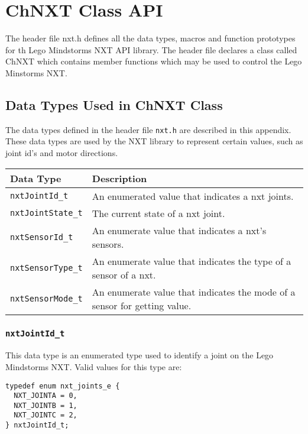 \section{\label{sec:chnxt_api}ChNXT Class API}
The header file nxt.h defines all the data types, macros and function prototypes 
for th Lego Mindstorms NXT API library. The header file declares a class called 
ChNXT which contains member functions which may be used to control the Lego
Minstorms NXT.\\
\subsection{\label{sec:datatypes}Data Types Used in ChNXT Class}
The data types defined in the header file {\tt nxt.h} are described in this 
appendix. These data types are used by the NXT library to represent certain values, 
such as joint id's and motor directions.\\

\noindent
\begin{longtable}{p{3.5cm}p{12cm}} 
    \hline
    Data Type& Description \\
    \hline 
    {\tt nxtJointId\_t} & An enumerated value that indicates a 
    nxt joints. \\
    {\tt nxtJointState\_t} & The current state of a nxt joint. \\
    {\tt nxtSensorId\_t} & An enumerate value that indicates a 
    nxt's sensors. \\
    {\tt nxtSensorType\_t} & An enumerate value that indicates 
    the type of a sensor of a nxt.\\
    {\tt nxtSensorMode\_t} & An enumerate value that indicates 
    the mode of a sensor for getting value. \\
    \hline
\end{longtable}

\subsubsection{\label{sec:nxtJointId_t}{\tt nxtJointId\_t}}
This data type is an enumerated type used to identify a joint on 
the Lego Mindstorms NXT. Valid values for this type are:
\begin{lstlisting}
typedef enum nxt_joints_e {
  NXT_JOINTA = 0,
  NXT_JOINTB = 1,
  NXT_JOINTC = 2,
} nxtJointId_t;
\end{lstlisting}

